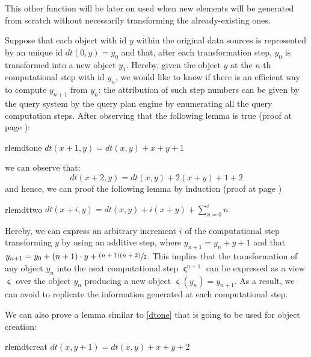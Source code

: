 This other function will be later on used when new elements will be generated from scratch without necessarily transforming the already-existing ones.

Suppose that each object with id $y$ within the original data sources is represented by an unique id $dt(0,y)=y_0$ and that, after each transformation step, $y_0$ is transformed into a new object $y_{1}$. Hereby, given the object $y$ at the $n$-th computational step with id $y_n$, we would like to know if there is an efficient way to compute $y_{n+1}$ from $y_{n}$: the attribution of such step numbers can be given by the query system by the query plan engine by enumerating all the query computation steps. After observing that the following lemma is true (proof at page \pageref{proof:dtone}):
\begin{restatable}{rlem}{dtone}
	\label{dtone}
	$dt(x+1,y)=dt(x,y)+x+y+1$
\end{restatable}
we can observe that:
\[dt(x+2,y)=dt(x,y)+2(x+y)+1+2\]
and hence, we can proof the following lemma by induction (proof at page \pageref{proof:dttwo})
\begin{restatable}{rlem}{dttwo}
	\label{dttwo}
	$dt(x+i,y)=dt(x,y)+i(x+y)+\sum_{n=0}^in$
\end{restatable}

Hereby, we can express an arbitrary increment $i$ of the computational step transforming $y$ by using an additive step, where $y_{n+1}=y_n+y+1$ and that $y_{n+1}=y_0+(n+1)\cdot y+\sfrac{(n+1)(n+2)}{2}$. This implies that the transformation of any object $y_n$ into the next computational step $\stigma^{n+1}$ can be expressed as a view $\stigma$ over the object $y_n$ producing a new object $\stigma(y_n)=y_{n+1}$. As a result, we can avoid to replicate the information generated at each computational step.

We can also prove a lemma similar to \ref{dtone} that is going to be used for object creation:
\begin{restatable}{rlem}{dtcreat}
	\label{dtcreat}
	$dt(x,y+1)=dt(x,y)+x+y+2$
\end{restatable}


